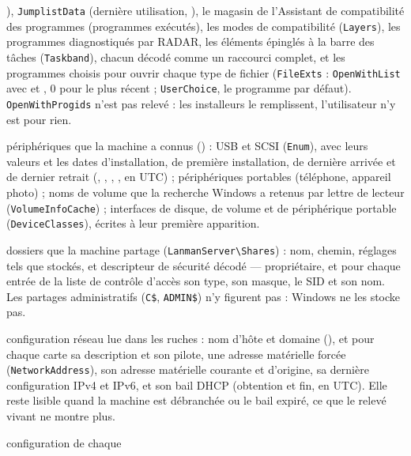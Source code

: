 \documentclass[11pt,a4paper,oneside]{report}
\begin{document}
\begin{description}[style=nextline,leftmargin=1.2em]
        ), \texttt{JumplistData} (dernière utilisation,
        ), le magasin de l'Assistant de compatibilité des
        programmes (programmes exécutés), les modes de compatibilité
        (\texttt{Layers}), les programmes diagnostiqués par RADAR, les éléments
        épinglés à la barre des tâches (\texttt{Taskband}), chacun décodé comme
        un raccourci complet, et les programmes choisis pour ouvrir chaque type
        de fichier (\texttt{FileExts} : \texttt{OpenWithList} avec
         et , 0 pour le plus récent ;
        \texttt{UserChoice}, le programme par défaut). \texttt{OpenWithProgids}
        n'est pas relevé : les installeurs le remplissent, l'utilisateur n'y
        est pour rien.
  \item[\fichier{devices.json}] périphériques que la machine a connus
        () : USB et SCSI (\texttt{Enum}), avec leurs valeurs et les
        dates d'installation, de première installation, de dernière arrivée et
        de dernier retrait (, ,
        , , en UTC) ; périphériques
        portables (téléphone, appareil photo) ; noms de volume que la recherche
        Windows a retenus par lettre de lecteur (\texttt{VolumeInfoCache}) ;
        interfaces de disque, de volume et de périphérique portable
        (\texttt{DeviceClasses}), écrites à leur première apparition.
  \item[\fichier{network\_shares.json}] dossiers que la machine partage
        (\texttt{LanmanServer\textbackslash Shares}) : nom, chemin, réglages tels
        que stockés, et descripteur de sécurité décodé --- propriétaire, et pour
        chaque entrée de la liste de contrôle d'accès son type, son masque, le
        SID et son nom. Les partages administratifs (\texttt{C\$},
        \texttt{ADMIN\$}) n'y figurent pas : Windows ne les stocke pas.
  \item[\fichier{network\_configuration.json}] configuration réseau lue dans
        les ruches : nom d'hôte et domaine (), et pour chaque carte
        sa description et son pilote, une adresse matérielle forcée
        (\texttt{NetworkAddress}), son adresse matérielle courante et
        d'origine, sa dernière configuration IPv4 et IPv6, et son bail DHCP
        (obtention et fin, en UTC). Elle reste lisible quand la machine est
        débranchée ou le bail expiré, ce que le relevé vivant ne montre plus.
  \item[\fichier{event\_log\_configuration.json}] configuration de chaque

\end{description}
\end{document}
